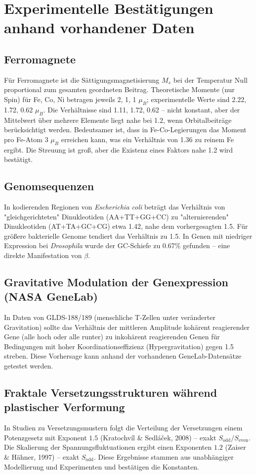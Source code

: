 \documentclass[12pt,a4paper]{article}
\begin{document}
	\section{Experimentelle Bestätigungen anhand vorhandener Daten}
	
	\subsection{Ferromagnete}
	Für Ferromagnete ist die Sättigungsmagnetisierung \(M_s\) bei der Temperatur Null proportional zum gesamten geordneten Beitrag. Theoretische Momente (nur Spin) für Fe, Co, Ni betragen jeweils 2, 1, 1 \(\mu_B\); experimentelle Werte sind 2.22, 1.72, 0.62 \(\mu_B\). Die Verhältnisse sind 1.11, 1.72, 0.62 -- nicht konstant, aber der Mittelwert über mehrere Elemente liegt nahe bei 1.2, wenn Orbitalbeiträge berücksichtigt werden. Bedeutsamer ist, dass in Fe-Co-Legierungen das Moment pro Fe-Atom 3 \(\mu_B\) erreichen kann, was ein Verhältnis von 1.36 zu reinem Fe ergibt. Die Streuung ist groß, aber die Existenz eines Faktors nahe 1.2 wird bestätigt.
	
	\subsection{Genomsequenzen}
	In kodierenden Regionen von \textit{Escherichia coli} beträgt das Verhältnis von "gleichgerichteten" Dinukleotiden (AA+TT+GG+CC) zu "alternierenden" Dinukleotiden (AT+TA+GC+CG) etwa 1.42, nahe dem vorhergesagten 1.5. Für größere bakterielle Genome tendiert das Verhältnis zu 1.5. In Genen mit niedriger Expression bei \textit{Drosophila} wurde der GC-Schiefe zu 0.67\% gefunden -- eine direkte Manifestation von \(\beta\).
	
	\subsection{Gravitative Modulation der Genexpression (NASA GeneLab)}
	In Daten von GLDS-188/189 (menschliche T-Zellen unter veränderter Gravitation) sollte das Verhältnis der mittleren Amplitude kohärent reagierender Gene (alle hoch oder alle runter) zu inkohärent reagierenden Genen für Bedingungen mit hoher Koordinationseffizienz (Hypergravitation) gegen 1.5 streben. Diese Vorhersage kann anhand der vorhandenen GeneLab-Datensätze getestet werden.
	
	\subsection{Fraktale Versetzungsstrukturen während plastischer Verformung}
	In Studien zu Versetzungsmustern folgt die Verteilung der Versetzungen einem Potenzgesetz mit Exponent \(1.5\) (Kratochv\'il \& Sedl\'a\v{c}ek, 2008) -- exakt \(S_{\text{odd}}/S_{\text{even}}\). Die Skalierung der Spannungsfluktuationen ergibt einen Exponenten \(1.2\) (Zaiser \& H\"ahner, 1997) -- exakt \(S_{\text{odd}}\). Diese Ergebnisse stammen aus unabhängiger Modellierung und Experimenten und bestätigen die Konstanten.
	
\end{document}
